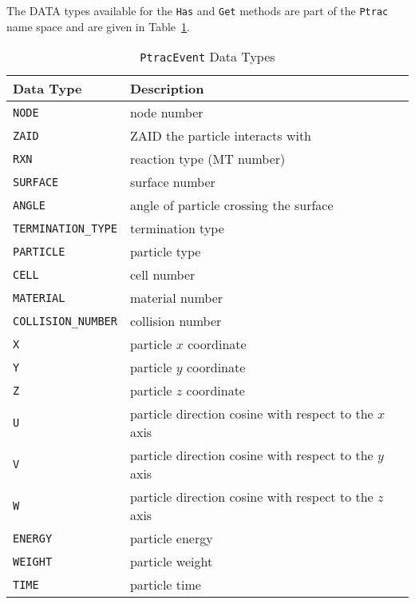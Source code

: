 \documentclass[11pt]{article}
\begin{document}
The DATA types available for the \texttt{Has} and \texttt{Get} methods are part
of the \texttt{Ptrac} name space and are given in
Table~\ref{tab:ptracevent_data_types}.

\begin{table}[]
  \begin{center}
  \caption{\texttt{PtracEvent} Data Types}
  \label{tab:ptracevent_data_types}
    \begin{tabular}{lp{4.0in}}
      \toprule
        Data Type & Description \\
      \midrule
        \texttt{NODE}              & node number \\
        \texttt{ZAID}              & ZAID the particle interacts with \\
        \texttt{RXN}               & reaction type (MT number) \\
        \texttt{SURFACE}           & surface number \\
        \texttt{ANGLE}             & angle of particle crossing the surface \\
        \texttt{TERMINATION\_TYPE} & termination type \\
        \texttt{PARTICLE}          & particle type \\
        \texttt{CELL}              & cell number \\
        \texttt{MATERIAL}          & material number \\
        \texttt{COLLISION\_NUMBER} & collision number \\
        \texttt{X}                 & particle $x$ coordinate \\
        \texttt{Y}                 & particle $y$ coordinate \\
        \texttt{Z}                 & particle $z$ coordinate \\
        \texttt{U}                 & particle direction cosine with respect to the $x$ axis \\
        \texttt{V}                 & particle direction cosine with respect to the $y$ axis \\
        \texttt{W}                 & particle direction cosine with respect to the $z$ axis \\
        \texttt{ENERGY}            & particle energy \\
        \texttt{WEIGHT}            & particle weight \\
        \texttt{TIME}              & particle time  \\
      \bottomrule
    \end{tabular}
  \end{center}
\end{table}
\end{document}
